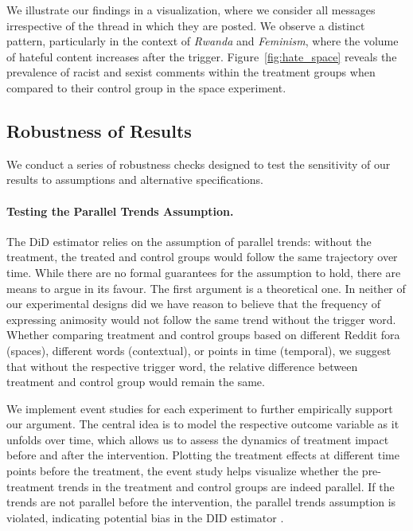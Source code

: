 We illustrate our findings in a visualization, where we consider all messages irrespective of the thread in which they are posted. We observe a distinct pattern, particularly in the context of \textit{Rwanda} and \textit{Feminism}, where the volume of hateful content increases after the trigger. Figure~\ref{fig:hate_space} reveals the prevalence of racist and sexist comments within the treatment groups when compared to their control group in the space experiment. 


\subsection{Robustness of Results}
We conduct a series of robustness checks designed to test the sensitivity of our results to assumptions and alternative specifications.

\paragraph{Testing the Parallel Trends Assumption.}
\label{sec:parallel_trends}
The DiD estimator relies on the assumption of parallel trends: without the treatment, the treated and control groups would follow the same trajectory over time. While there are no formal guarantees for the assumption to hold, there are means to argue in its favour. The first argument is a theoretical one. In neither of our experimental designs did we have reason to believe that the frequency of expressing animosity would not follow the same trend without the trigger word. Whether comparing treatment and control groups based on different Reddit fora (spaces), different words (contextual), or points in time (temporal), we suggest that without the respective trigger word, the relative difference between treatment and control group would remain the same.   

We implement event studies for each experiment to further empirically support our argument. The central idea is to model the respective outcome variable as it unfolds over time, which allows us to assess the dynamics of treatment impact before and after the intervention. Plotting the treatment effects at different time points before the treatment, the event study helps visualize whether the pre-treatment trends in the treatment and control groups are indeed parallel. If the trends are not parallel before the intervention, the parallel trends assumption is violated, indicating potential bias in the DID estimator \cite{roth2023s}. 

